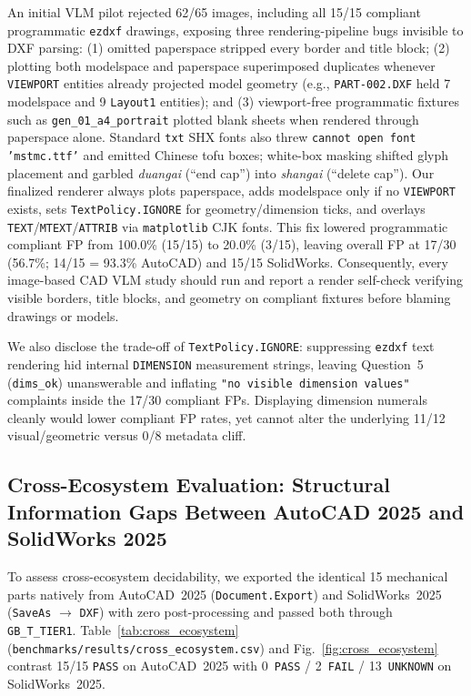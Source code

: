 \documentclass[nocopyright,nolists,upint,varvw,hyphenate]{asmejour}
\begin{document}
An initial VLM pilot rejected 62/65 images, including all 15/15 compliant programmatic \texttt{ezdxf} drawings, exposing three rendering-pipeline bugs invisible to DXF parsing: (1) omitted paperspace stripped every border and title block; (2) plotting both modelspace and paperspace superimposed duplicates whenever \texttt{VIEWPORT} entities already projected model geometry (e.g., \texttt{PART-002.DXF} held 7 modelspace and 9 \texttt{Layout1} entities); and (3) viewport-free programmatic fixtures such as \texttt{gen\_01\_a4\_portrait} plotted blank sheets when rendered through paperspace alone. Standard \texttt{txt} SHX fonts also threw \texttt{cannot open font 'mstmc.ttf'} and emitted Chinese tofu boxes; white-box masking shifted glyph placement and garbled \emph{duangai} (``end cap'') into \emph{shangai} (``delete cap''). Our finalized renderer always plots paperspace, adds modelspace only if no \texttt{VIEWPORT} exists, sets \texttt{TextPolicy.IGNORE} for geometry/dimension ticks, and overlays \texttt{TEXT}/\texttt{MTEXT}/\texttt{ATTRIB} via \texttt{matplotlib} CJK fonts. This fix lowered programmatic compliant FP from 100.0\% (15/15) to 20.0\% (3/15), leaving overall FP at 17/30 (56.7\%; 14/15 = 93.3\% AutoCAD) and 15/15 SolidWorks. Consequently, every image-based CAD VLM study should run and report a render self-check verifying visible borders, title blocks, and geometry on compliant fixtures before blaming drawings or models.

We also disclose the trade-off of \texttt{TextPolicy.IGNORE}: suppressing \texttt{ezdxf} text rendering hid internal \texttt{DIMENSION} measurement strings, leaving Question~5 (\texttt{dims\_ok}) unanswerable and inflating \texttt{"no visible dimension values"} complaints inside the 17/30 compliant FPs. Displaying dimension numerals cleanly would lower compliant FP rates, yet cannot alter the underlying 11/12 visual/geometric versus 0/8 metadata cliff.

\subsection{Cross-Ecosystem Evaluation: Structural Information Gaps Between AutoCAD 2025 and SolidWorks 2025}\label{sec:cross_eco}

To assess cross-ecosystem decidability, we exported the identical 15 mechanical parts natively from AutoCAD~2025 (\texttt{Document.Export}) and SolidWorks~2025 (\texttt{SaveAs} $\to$ \texttt{DXF}) with zero post-processing and passed both through \texttt{GB\_T\_TIER1}. Table~\ref{tab:cross_ecosystem} (\texttt{benchmarks/\allowbreak results/\allowbreak cross\_\allowbreak ecosystem.csv}) and Fig.~\ref{fig:cross_ecosystem} contrast 15/15 \texttt{PASS} on AutoCAD~2025 with 0~\texttt{PASS} / 2~\texttt{FAIL} / 13~\texttt{UNKNOWN} on SolidWorks~2025.
\end{document}
